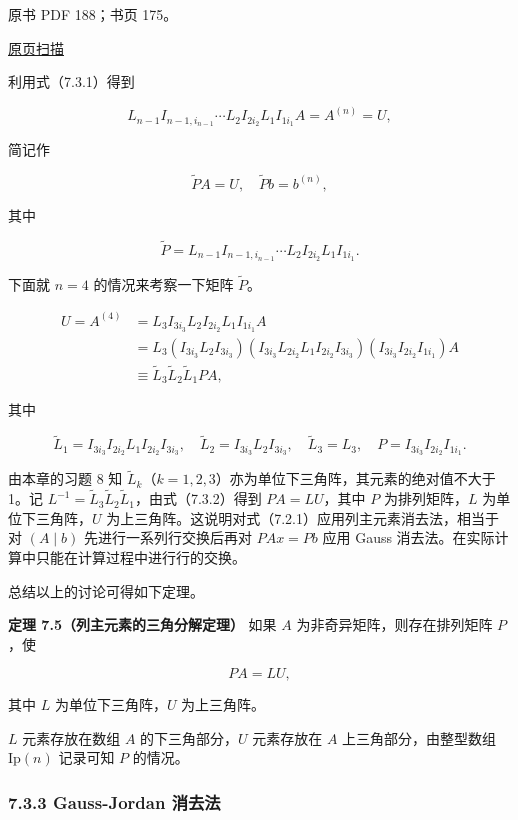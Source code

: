 \documentclass[
  10pt,
  fontset=fandol]{ctexart}
\begin{document}
原书 PDF 188；书页 175。

\href{../../../source-images/pdf-188.jpeg}{原页扫描}

利用式（7.3.1）得到

\[L_{n-1}I_{n-1,i_{n-1}}\cdots L_2I_{2i_2}L_1I_{1i_1}A=A^{(n)}=U,\]

简记作

\[\widetilde{P}A=U,\quad\widetilde{P}b=b^{(n)},\]

其中

\[\widetilde{P}=L_{n-1}I_{n-1,i_{n-1}}\cdots L_2I_{2i_2}L_1I_{1i_1}.\]

下面就 \(n=4\) 的情况来考察一下矩阵 \(\widetilde{P}\)。

\[
\begin{aligned}
U=A^{(4)}&=L_3I_{3i_3}L_2I_{2i_2}L_1I_{1i_1}A\\
&=L_3(I_{3i_3}L_2I_{3i_3})(I_{3i_3}L_{2i_2}L_1I_{2i_2}I_{3i_3})(I_{3i_3}I_{2i_2}I_{1i_1})A\\
&\equiv\widetilde{L}_3\widetilde{L}_2\widetilde{L}_1PA,
\end{aligned}
\tag{7.3.2}
\]

其中

\[\widetilde{L}_1=I_{3i_3}I_{2i_2}L_1I_{2i_2}I_{3i_3},\quad
\widetilde{L}_2=I_{3i_3}L_2I_{3i_3},\quad
\widetilde{L}_3=L_3,\quad P=I_{3i_3}I_{2i_2}I_{1i_1}.\]

由本章的习题 8 知 \(\widetilde{L}_k\)（\(k=1,2,3\)）亦为单位下三角阵，其元素的绝对值不大于 1。记 \(L^{-1}=\widetilde{L}_3\widetilde{L}_2\widetilde{L}_1\)，由式（7.3.2）得到 \(PA=LU\)，其中 \(P\) 为排列矩阵，\(L\) 为单位下三角阵，\(U\) 为上三角阵。这说明对式（7.2.1）应用列主元素消去法，相当于对 \((A\mid b)\) 先进行一系列行交换后再对 \(PAx=Pb\) 应用 Gauss 消去法。在实际计算中只能在计算过程中进行行的交换。

总结以上的讨论可得如下定理。

\textbf{定理 7.5（列主元素的三角分解定理）} 如果 \(A\) 为非奇异矩阵，则存在排列矩阵 \(P\)，使

\[PA=LU,\]

其中 \(L\) 为单位下三角阵，\(U\) 为上三角阵。

\(L\) 元素存放在数组 \(A\) 的下三角部分，\(U\) 元素存放在 \(A\) 上三角部分，由整型数组 \(\mathrm{Ip}(n)\) 记录可知 \(P\) 的情况。

\subsubsection{7.3.3 Gauss-Jordan 消去法}\label{gauss-jordan-ux6d88ux53bbux6cd5}
\end{document}
